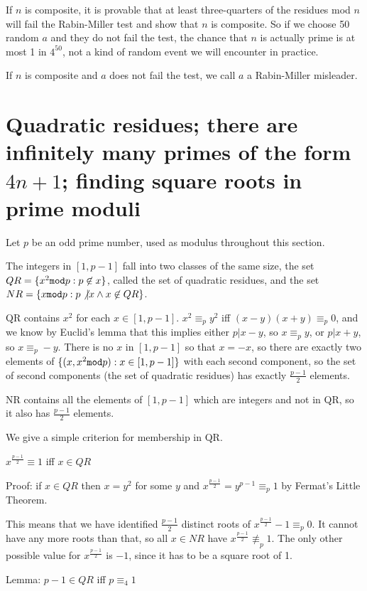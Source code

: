 \documentclass[12pt]{article}
\begin{document}
If $n$ is composite, it is provable that at least three-quarters of the residues mod $n$ will fail the Rabin-Miller test and show that $n$ is composite.  So if we choose 50 random $a$ and they do not fail the test, the chance that $n$ is actually prime is at most 1 in $4^{50}$, not a kind of random event we will encounter in practice.

If $n$ is composite and $a$ does not fail the test, we call $a$ a Rabin-Miller misleader.

\section{Quadratic residues;  there are infinitely many primes of the form $4n+1$;  finding square roots in prime moduli}

Let $p$ be an odd prime number, used as modulus throughout this section.

The integers in $[1,p-1]$ fall into two classes of the same size, the set $QR = \{x^2 {\tt mod} p:p \not\in x\}$, called the set of quadratic residues, and the set $NR = \{x {\tt mod} p:p \not| x  \wedge x \not\in QR\}$.

QR contains $x^2$ for each $x \in [1,p-1]$.  $x^2 \equiv_p y^2$ iff $(x-y)(x+y)\equiv_p 0$, and we know by Euclid's lemma that this implies either $p|x-y$, so $x \equiv_p y$, or $p|x+y$, so $x \equiv_p -y$.  There is no $x$ in $[1,p-1]$ so that
$x=-x$, so there are exactly two elements of $\{(x,x^2{\tt mod}p):x \in [1,p-1]\}$ with each second component, so the set of second components (the set of quadratic residues) has exactly $\frac{p-1}2$ elements.

NR contains all the elements of $[1,p-1]$ which are integers and not in QR, so it also has $\frac{p-1}2$ elements.

We give a simple criterion for membership in QR.

$x^\frac{p-1}2 \equiv 1$ iff $x \in QR$

Proof:  if $x \in QR$ then $x=y^2$ for some $y$ and $x^\frac{p-1}2 = y^{p-1} \equiv_p 1$ by Fermat's Little Theorem.

This means that we have identified $\frac{p-1}2$ distinct roots of $x^\frac{p-1}2 -1\equiv_p 0$.  It cannot have any more roots than that, so all $x \in NR$ have $x^\frac{p-1}2 \not\equiv_p 1$.  The only other possible value for $x^\frac{p-1}2$ is
$-1$, since it has to be a square root of 1.

Lemma:  $p-1 \in QR$ iff $p \equiv_4 1$
\end{document}
